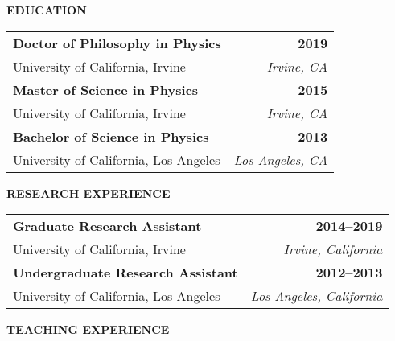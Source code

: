 %
\curriculumvitae
{

\textbf{EDUCATION}
  
  \begin{tabular*}{1\textwidth}{@{\extracolsep{\fill}}lr}
    \textbf{Doctor of Philosophy in Physics} & \textbf{2019} \\
    \vspace{6pt}
    University of California, Irvine & \emph{Irvine, CA} \\
    \textbf{Master of Science in Physics} & \textbf{2015} \\
    \vspace{6pt}
    University of California, Irvine & \emph{Irvine, CA} \\
    \textbf{Bachelor of Science in Physics} & \textbf{2013} \\
    \vspace{6pt}
    University of California, Los Angeles & \emph{Los Angeles, CA} \\
  \end{tabular*}

  \vspace{12pt}


\vspace{12pt}
\textbf{RESEARCH EXPERIENCE}

  \begin{tabular*}{1\textwidth}{@{\extracolsep{\fill}}lr}
    \textbf{Graduate Research Assistant} & \textbf{2014--2019} \\
    \vspace{6pt}
    University of California, Irvine & \emph{Irvine, California} \\

    \textbf{Undergraduate Research Assistant} & \textbf{2012--2013} \\
    \vspace{6pt}
    University of California, Los Angeles & \emph{Los Angeles, California} \\
    
  \end{tabular*}

\vspace{12pt}
\textbf{TEACHING EXPERIENCE}

}
